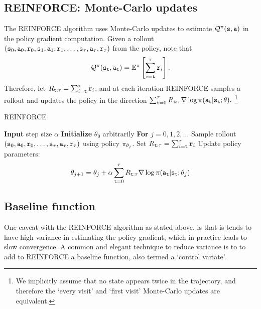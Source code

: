 \subsection{REINFORCE: Monte-Carlo updates}

The REINFORCE algorithm uses Monte-Carlo updates to estimate $\mathcal{Q}^\pi
({\tt s},{\tt a})$ in the policy gradient computation. Given a rollout
$({\tt s}_0,{\tt a}_0,{\tt r}_0,{\tt s}_1,{\tt a}_1,{\tt r}_1, \ldots ,
{\tt s}_\tau,{\tt a}_\tau,{\tt r}_\tau)$ from the policy, note that
\begin{equation*}
    \mathcal{Q}^\pi
({\tt s}_{{\tt t}},{\tt a}_{{\tt t}}) = \mathbb{E}^{\pi}\left[ \sum_{i={\tt t}}^\tau {\tt r}_i \right]. 
\end{equation*}
Therefore, let $R_{{\tt t}:\tau}=\sum_{i={\tt t}}^\tau {\tt r}_i$, and at each iteration REINFORCE samples a rollout and updates the policy in the direction 
$
\sum_{{\tt t}=0}^{\tau} R_{{\tt t}:\tau} \nabla \log
\pi({\tt a}_{\tt t}|{\tt s}_{\tt t};\theta).
$
\footnote{We implicitly assume that no state appears twice in the trajectory, and therefore the `every visit' and `first visit' Monte-Carlo updates are equivalent.}

\begin{algorithm}[H]
\caption{REINFORCE}\label{alg:reinforce}
\begin{algorithmic}[1]
\State \textbf{Input} step size $\alpha$
\State \textbf{Initialize} $\theta_0$ arbitrarily
\State \textbf{For} $j = 0,1,2,\dots$
\State \quad Sample rollout $({\tt s}_0, {\tt a}_0, {\tt r}_0, \ldots, {\tt s}_\tau, {\tt a}_\tau, {\tt r}_\tau)$ using policy $\pi_{\theta_j}$.
\State \quad Set $R_{{\tt t}:\tau} = \sum_{i={\tt t}}^\tau {\tt r}_i$
\State \quad Update policy parameters:
    \[
    \theta_{j+1} = \theta_j + \alpha \sum_{{\tt t}=0}^{\tau} R_{{\tt t}:\tau} \nabla \log \pi({\tt a}_{\tt t} | {\tt s}_{\tt t}; \theta_j)
    \]
\end{algorithmic}
\end{algorithm}

\subsection*{Baseline function}
One caveat with the REINFORCE algorithm as stated above, is that is tends to have high variance in estimating the policy gradient, which in practice leads to slow convergence. A common and elegant technique to reduce variance is to to add to REINFORCE a baseline function, also termed a `control variate'.


